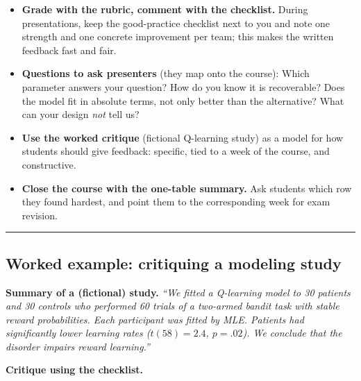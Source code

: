 \begin{itemize}
\tightlist
\item
  \textbf{Grade with the rubric, comment with the checklist.} During
  presentations, keep the good-practice checklist next to you and note
  one strength and one concrete improvement per team; this makes the
  written feedback fast and fair.
\item
  \textbf{Questions to ask presenters} (they map onto the course): Which
  parameter answers your question? How do you know it is recoverable?
  Does the model fit in absolute terms, not only better than the
  alternative? What can your design \emph{not} tell us?
\item
  \textbf{Use the worked critique} (fictional Q-learning study) as a
  model for how students should give feedback: specific, tied to a week
  of the course, and constructive.
\item
  \textbf{Close the course with the one-table summary.} Ask students
  which row they found hardest, and point them to the corresponding week
  for exam revision.
\end{itemize}

\begin{center}\rule{0.5\linewidth}{0.5pt}\end{center}

\subsection{Worked example: critiquing a modeling study}

\textbf{Summary of a (fictional) study.} \emph{``We fitted a Q-learning
model to 30 patients and 30 controls who performed 60 trials of a
two-armed bandit task with stable reward probabilities. Each participant
was fitted by MLE. Patients had significantly lower learning rates
(\(t(58) = 2.4\), \(p = .02\)). We conclude that the disorder impairs
reward learning.''}

\textbf{Critique using the checklist.}

